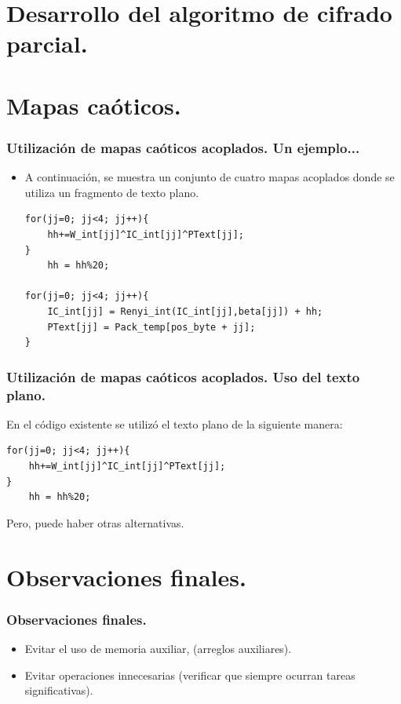 \documentclass[10pt,fleqn]{beamer}
\begin{document}
\section{Desarrollo del algoritmo de cifrado parcial.}





\section{Mapas caóticos.}

\begin{frame}[fragile]
\frametitle{Utilización de mapas caóticos acoplados.  Un ejemplo...  }

\begin{itemize}

\item A continuación, se muestra un conjunto de cuatro mapas acoplados donde se utiliza un fragmento de texto plano.
\begin{lstlisting}
for(jj=0; jj<4; jj++){
	hh+=W_int[jj]^IC_int[jj]^PText[jj];
}
	hh = hh%20;

for(jj=0; jj<4; jj++){
	IC_int[jj] = Renyi_int(IC_int[jj],beta[jj]) + hh;
    PText[jj] = Pack_temp[pos_byte + jj];
}				
\end{lstlisting}

\end{itemize}

\end{frame}




\begin{frame}[fragile]
\frametitle{  Utilización de mapas caóticos acoplados.  Uso del texto plano. }

En el código existente se utilizó el texto plano de la siguiente manera:
\begin{lstlisting}
for(jj=0; jj<4; jj++){
	hh+=W_int[jj]^IC_int[jj]^PText[jj];
}
	hh = hh%20;			
\end{lstlisting}




Pero, puede haber otras alternativas.


\end{frame}



\section{Observaciones finales.}
\begin{frame}[fragile]
\frametitle{  Observaciones finales. }


\begin{itemize}
\item Evitar el uso de memoria auxiliar, (arreglos auxiliares).

\item Evitar operaciones innecesarias (verificar que siempre ocurran tareas significativas).

\end{itemize}

\end{frame}
\end{document}
